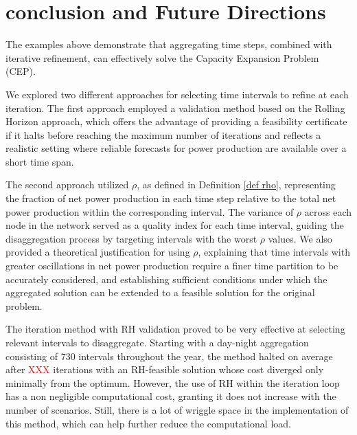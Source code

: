 \documentclass[smallextended,natbib]{svjour3}       %
\numberwithin{definition}{section}
\numberwithin{theorem}{section}
\numberwithin{proposition}{section}
\begin{document}








\section{conclusion and Future Directions}

The examples above demonstrate that aggregating time steps, combined with iterative refinement, can effectively solve the Capacity Expansion Problem (CEP). 

We explored two different approaches for selecting time intervals to refine at each iteration. The first approach employed a validation method based on the Rolling Horizon approach, which offers the advantage of providing a feasibility certificate if it halts before reaching the maximum number of iterations and reflects a realistic setting where reliable forecasts for power production are available over a short time span.

The second approach utilized \(\rho\), as defined in Definition \ref{def rho}, representing the fraction of net power production in each time step relative to the total net power production within the corresponding interval. 
The variance of \(\rho\) across each node in the network served as a quality index for each time interval, guiding the disaggregation process by targeting intervals with the worst \(\rho\) values. 
We also provided a theoretical justification for using \(\rho\), explaining that time intervals with greater oscillations in net power production require a finer time partition to be accurately considered, and establishing sufficient conditions under which the aggregated solution can be extended to a feasible solution for the original problem.

The iteration method with RH validation proved to be very effective at selecting relevant intervals to disaggregate. Starting with a day-night aggregation consisting of 730 intervals throughout the year, the method halted on average after \textcolor{red}{XXX} iterations with an RH-feasible solution whose cost diverged only minimally from the optimum.
However, the use of RH within the iteration loop has a non negligible computational cost, granting it does not increase with the number of scenarios. Still, there is a lot of wriggle space in the implementation of this method, which can help further reduce the computational load.
\end{document}
